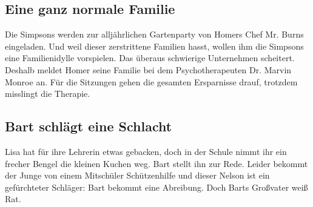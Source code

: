 \subsection{Eine ganz normale Familie}\label{7G04}
Die Simpsons werden zur alljährlichen Gartenparty von Homers Chef Mr. Burns eingeladen. Und weil dieser zerstrittene Familien hasst, wollen ihm die Simpsons eine Familienidylle vorspielen. Das überaus schwierige Unternehmen scheitert. Deshalb meldet Homer seine Familie bei dem Psychotherapeuten Dr. Marvin Monroe an. Für die Sitzungen gehen die gesamten Ersparnisse drauf, trotzdem misslingt die Therapie.



\subsection{Bart schlägt eine Schlacht}\label{7G05}
Lisa hat für ihre Lehrerin etwas gebacken, doch in der Schule nimmt ihr ein frecher Bengel die kleinen Kuchen weg. Bart stellt ihn zur Rede. Leider bekommt der Junge von einem Mitschüler Schützenhilfe und dieser Nelson ist ein gefürchteter Schläger: Bart bekommt eine Abreibung. Doch Barts Großvater weiß Rat.

